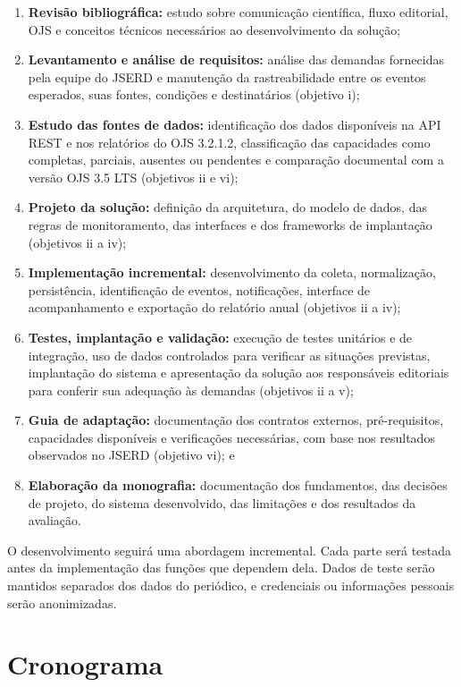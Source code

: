 \begin{enumerate}[label=\roman*.]
    \item \textbf{Revisão bibliográfica:} estudo sobre comunicação científica, fluxo editorial, OJS e conceitos técnicos necessários ao desenvolvimento da solução;
    \item \textbf{Levantamento e análise de requisitos:} análise das demandas fornecidas pela equipe do JSERD e manutenção da rastreabilidade entre os eventos esperados, suas fontes, condições e destinatários (objetivo i);
    \item \textbf{Estudo das fontes de dados:} identificação dos dados disponíveis na API REST e nos relatórios do OJS 3.2.1.2, classificação das capacidades como completas, parciais, ausentes ou pendentes e comparação documental com a versão OJS 3.5 LTS (objetivos ii e vi);
    \item \textbf{Projeto da solução:} definição da arquitetura, do modelo de dados, das regras de monitoramento, das interfaces e dos frameworks de implantação (objetivos ii a iv);
    \item \textbf{Implementação incremental:} desenvolvimento da coleta, normalização, persistência, identificação de eventos, notificações, interface de acompanhamento e exportação do relatório anual (objetivos ii a iv);
    \item \textbf{Testes, implantação e validação:} execução de testes unitários e de integração, uso de dados controlados para verificar as situações previstas, implantação do sistema e apresentação da solução aos responsáveis editoriais para conferir sua adequação às demandas (objetivos ii a v);
    \item \textbf{Guia de adaptação:} documentação dos contratos externos, pré-requisitos, capacidades disponíveis e verificações necessárias, com base nos resultados observados no JSERD (objetivo vi); e
    \item \textbf{Elaboração da monografia:} documentação dos fundamentos, das decisões de projeto, do sistema desenvolvido, das limitações e dos resultados da avaliação.
\end{enumerate}

O desenvolvimento seguirá uma abordagem incremental. Cada parte será testada antes da implementação das funções que dependem dela. Dados de teste serão mantidos separados dos dados do periódico, e credenciais ou informações pessoais serão anonimizadas.

\section{Cronograma}
\label{sec-intro-crono}

